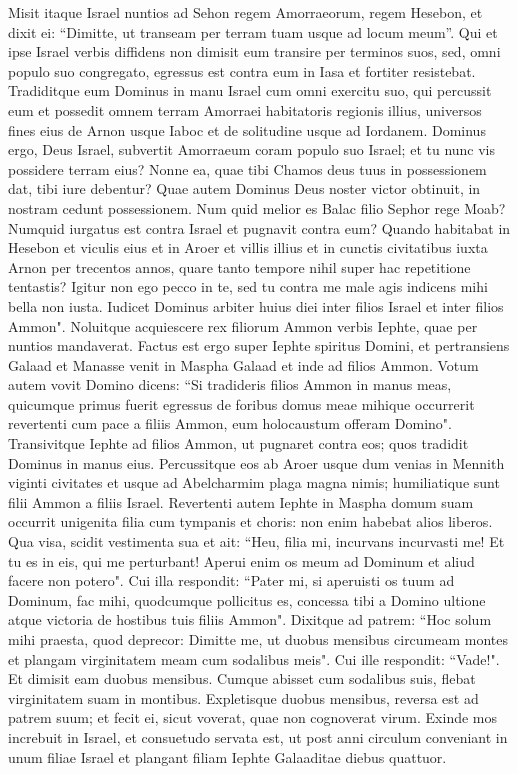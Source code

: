 \begin{biblechapter}
\verse Misit itaque Israel nuntios ad Sehon regem Amorraeorum, regem Hesebon, et dixit ei: “Dimitte, ut transeam per terram tuam usque ad locum meum”. 
\verse Qui et ipse Israel verbis diffidens non dimisit eum transire per terminos suos, sed, omni populo suo congregato, egressus est contra eum in Iasa et fortiter resistebat.  
\verse Tradiditque eum Dominus in manu Israel cum omni exercitu suo, qui percussit eum et possedit omnem terram Amorraei habitatoris regionis illius, 
\verse universos fines eius de Arnon usque Iaboc et de solitudine usque ad Iordanem.  
\verse Dominus ergo, Deus Israel, subvertit Amorraeum coram populo suo Israel; et tu nunc vis possidere terram eius? 
\verse Nonne ea, quae tibi Chamos deus tuus in possessionem dat, tibi iure debentur? Quae autem Dominus Deus noster victor obtinuit, in nostram cedunt possessionem. 
\verse Num quid melior es Balac filio Sephor rege Moab? Numquid iurgatus est contra Israel et pugnavit contra eum?  
\verse Quando habitabat in Hesebon et viculis eius et in Aroer et villis illius et in cunctis civitatibus iuxta Arnon per trecentos annos, quare tanto tempore nihil super hac repetitione tentastis? 
\verse Igitur non ego pecco in te, sed tu contra me male agis indicens mihi bella non iusta. Iudicet Dominus arbiter huius diei inter filios Israel et inter filios Ammon". 
\verse Noluitque acquiescere rex filiorum Ammon verbis Iephte, quae per nuntios mandaverat. 
\verse Factus est ergo super Iephte spiritus Domini, et pertransiens Galaad et Manasse venit in Maspha Galaad et inde ad filios Ammon. 
\verse Votum autem vovit Domino dicens: “Si tradideris filios Ammon in manus meas, 
\verse quicumque primus fuerit egressus de foribus domus meae mihique occurrerit revertenti cum pace a filiis Ammon, eum holocaustum offeram Domino". 
\verse Transivitque Iephte ad filios Ammon, ut pugnaret contra eos; quos tradidit Dominus in manus eius. 
\verse Percussitque eos ab Aroer usque dum venias in Mennith viginti civitates et usque ad Abelcharmim plaga magna nimis; humiliatique sunt filii Ammon a filiis Israel. 
\verse Revertenti autem Iephte in Maspha domum suam occurrit unigenita filia cum tympanis et choris: non enim habebat alios liberos. 
\verse Qua visa, scidit vestimenta sua et ait: “Heu, filia mi, incurvans incurvasti me! Et tu es in eis, qui me perturbant! Aperui enim os meum ad Dominum et aliud facere non potero". 
\verse Cui illa respondit: “Pater mi, si aperuisti os tuum ad Dominum, fac mihi, quodcumque pollicitus es, concessa tibi a Domino ultione atque victoria de hostibus tuis filiis Ammon". 
\verse Dixitque ad patrem: “Hoc solum mihi praesta, quod deprecor: Dimitte me, ut duobus mensibus circumeam montes et plangam virginitatem meam cum sodalibus meis". 
\verse Cui ille respondit: “Vade!". Et dimisit eam duobus mensibus. Cumque abisset cum sodalibus suis, flebat virginitatem suam in montibus. 
\verse Expletisque duobus mensibus, reversa est ad patrem suum; et fecit ei, sicut voverat, quae non cognoverat virum. Exinde mos increbuit in Israel, et consuetudo servata est,  
\verse ut post anni circulum conveniant in unum filiae Israel et plangant filiam Iephte Galaaditae diebus quattuor. 
\end{biblechapter}

